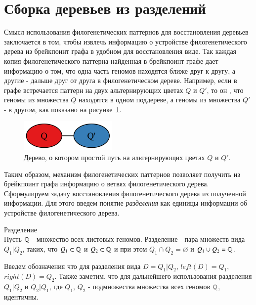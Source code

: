 \section{Сборка деревьев из разделений}
Смысл использования филогенетических паттернов для восстановления деревьев заключается в том,
чтобы извлечь информацию о устройстве филогенетического дерева из брейкпоинт графа в удобном для восстановления виде.
Так каждая копия филогенетического паттерна найденная в брейкпоинт графе дает информацию о том,
что одна часть геномов находятся ближе друг к другу, а другие - дальше друг от друга в филогенетическом дереве.
Например, если в графе встречается паттерн  на двух альтернирующих цветах $Q$ и $Q'$, то он ,
что геномы из множества $Q$ находятся в одном поддереве, а геномы из множества $Q'$ - в другом, как показано на рисунке~\ref{fig:division}.
\begin{figure}[H]
  \centering
  \includegraphics[max width=0.5\linewidth]{fig/2/division.png}
  \caption{Дерево, о котором  простой путь на альтернирующих цветах $Q$ и $Q'$.}
  \label{fig:division}
\end{figure}
Таким образом, механизм филогенетических паттернов позволяет получить из брейкпоинт графа информацию о ветвях филогенетического дерева.
Сформулируем задачу восстановления филогенетического дерева из полученной информации.
Для этого введем понятие \textit{разделения} как единицы информации об устройстве филогенетического дерева.
\begin{define}{Разделение} \\
  Пусть $\mathbb{Q}$ - множество всех листовых геномов.
  Разделение - пара множеств вида $Q_1|Q_2$, таких, что $Q_1 \subset \mathbb{Q}$ и $Q_2 \subset \mathbb{Q}$ и при этом
  $Q_1 \cap Q_2 = \varnothing$ и $Q_1 \cup Q_2 = \mathbb{Q}$.
\end{define}
Введем обозначения что для разделения вида $D = Q_1|Q_2$, $left(D) = Q_1$, $right(D) = Q_2$.
Также заметим, что для дальнейшего использования разделения $Q_1|Q_2$ и $Q_2|Q_1$,
где $Q_1$, $Q_2$ - подмножества множества всех геномов $\mathbb{Q}$, идентичны.

